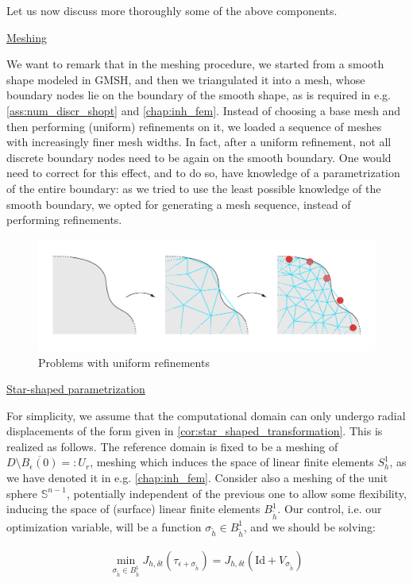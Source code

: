 \documentclass[english,a4paper,9pt,oneside]{scrbook}	%
\theoremstyle{break}
\theoremstyle{remark}
\newcommand{\mS}{\mathbb{S}^{n-1}}
\newcommand{\id}{\text{Id}}
\newcommand{\eps}{\epsilon}
\begin{document}
Let us now discuss more thoroughly some of the above components.

\underline{Meshing}

We want to remark that in the meshing procedure, we started from a smooth shape modeled in GMSH, and then we triangulated it into a mesh, whose boundary nodes lie on the boundary of the smooth shape, as is required in e.g. \cref{ass:num_discr_shopt} and \cref{chap:inh_fem}. Instead of choosing a base mesh and then performing (uniform) refinements on it, we loaded a sequence of meshes with increasingly finer mesh widths. In fact, after a uniform refinement, not all discrete boundary nodes need to be again on the smooth boundary. One would need to correct for this effect, and to do so, have knowledge of a parametrization of the entire boundary: as we tried to use the least possible knowledge of the smooth boundary, we opted for generating a mesh sequence, instead of performing refinements.

\begin{figure}[H]
\centering
\includegraphics[width=0.75\columnwidth]{Images/UniformRefinement.pdf}
\caption{Problems with uniform refinements}\label{fig:uniform_refinement}
\end{figure}

\underline{Star-shaped parametrization}

For simplicity, we assume that the computational domain can only undergo radial displacements of the form given in \cref{cor:star_shaped_transformation}. This is realized as follows. The reference domain is fixed to be a meshing of $D\setminus \overline{B_\epsilon(0)}=:U_r$, meshing which induces the space of linear finite elements $S^1_h$, as we have denoted it in e.g. \cref{chap:inh_fem}. Consider also a meshing of the unit sphere $\mS$, potentially independent of the previous one to allow some flexibility, inducing the space of (surface) linear finite elements $B^1_{\tilde{h}}$. Our control, i.e. our optimization variable, will be a function $ \sigma_{\tilde{h}} \in B^1_{\tilde{h}}$, and we should be solving:

\begin{align*}
	\min_{\sigma_{\tilde{h}} \in B^1_{\tilde{h}}} J_{h,\delta t}(\tau_{\eps+\sigma_{\tilde{h}}}) = J_{h,\delta t }(\id  + V_{\sigma_{\tilde{h}}})
\end{align*}
\end{document}
